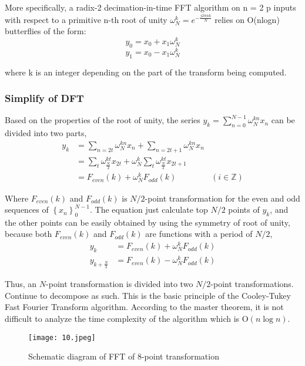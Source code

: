 \documentclass[12pt,a4paper]{article}
\begin{document}
More specifically, a radix-2 decimation-in-time FFT algorithm on n = 2 p inputs with respect to a primitive n-th root of unity $\omega _{N}^{k}=e^{-{\frac {j2\pi n
k}{N}}}$ relies on O(nlogn) butterflies of the form:
$$y_0=x_0+x_1 \omega _{N}^{k}$$
$$y_1=x_0-x_1 \omega _{N}^{k}$$

where k is an integer depending on the part of the transform being computed. 


\subsubsection{Simplify of DFT}
Based on the properties of the root of unity, the series  $ y_{k}=\sum _{n=0}^{N-1}\omega_{N}^{kn}x_{n}$ can be divided into two parts,
\begin{align*}
y_{k} &=\sum_{n=2t}\omega_{N}^{kn}x_{n}+\sum_{n=2t+1}\omega_{N}^{kn}x_{n}\\
&=\sum_{t}\omega _{\frac {N}{2}}^{kt}x_{2t}+\omega _{N}^{k}\sum _{t}\omega _{\frac {N}{2}}^{kt}x_{2t+1}\\
&=F_{even}(k)+\omega _{N}^{k}F_{odd}(k)&(i\in \mathbb {Z} )
\end{align*}

Where $F_{even}(k)$ and $F_{odd}(k)$ is $N/2$-point transformation for the even and odd sequences of $\left\{x_n \right\}^{N-1}_0$. The equation just calculate top $N/2$ points of $y_k$, and the other points can be easily obtained by using the symmetry of root of unity, because both $F_{even}(k)$ and $F_{odd}(k)$ are functions with a period of $N/2$,
\begin{align*}
y_{k}&=F_{even}(k)+\omega_{N}^{k}F_{odd}(k)\\
y_{k+{\frac {N}{2}}}&=F_{even}(k)-\omega_{N}^{k}F_{odd}(k)
\end{align*}

Thus, an $N$-point transformation is divided into two $N/2$-point transformations. Continue to decompose as such. This is the basic principle of the Cooley-Tukey Fast Fourier Transform algorithm. According to the master theorem, it is not difficult to analyze the time complexity of the algorithm which is $\mathrm {O} (n\log n)$.
\begin{figure}[hbtp]
\centering
\texttt{[image: 10.jpeg]}
\caption{Schematic diagram of FFT of 8-point transformation}
\end{figure}
\end{document}
